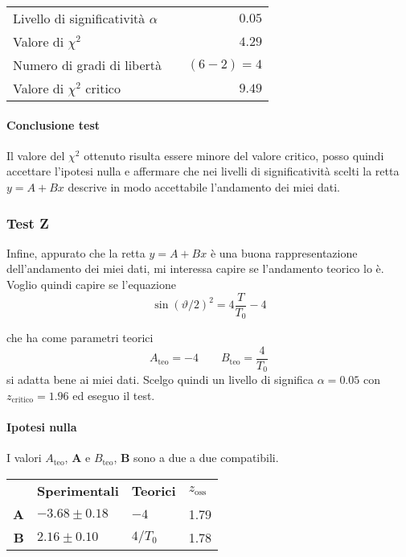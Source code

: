 \documentclass{article}
\begin{document}
\vspace{0.7cm}
\begin{table}[H]
	\centering
	\begin{tabular}{lr} 
		Livello di significatività $\alpha$		&$\quad 0.05$  \\
		Valore di $\chi ^2$             	& $\quad 4.29$       \\
		Numero di gradi di libertà      	& $\quad (6-2) = 4$         \\   
		Valore di $\chi ^2$ critico     	& $\quad 9.49$
	\end{tabular}
\end{table}
\vspace{0.7cm}

\paragraph{Conclusione test} Il valore del $\chi^2$ ottenuto risulta essere minore del valore critico, posso quindi accettare l'ipotesi nulla e affermare che nei livelli di significatività scelti la retta $y = A + Bx$ descrive in modo accettabile l'andamento dei miei dati.

\subsubsection{Test Z}
Infine, appurato che la retta $y = A + Bx$ è una buona rappresentazione dell'andamento dei miei dati, mi interessa capire se l'andamento teorico lo è. Voglio quindi capire se l'equazione 
\[
\sin{\left(\vartheta/2\right)}^2 = 4\frac{T}{T_0} - 4
\]

che ha come parametri teorici
\[
A_\text{teo} = -4 \qquad B_\text{teo} =  \frac{4}{T_0}
\]
si adatta bene ai miei dati. Scelgo quindi un livello di significa $\alpha = 0.05$ con $z_{\text{critico}} = 1.96$ ed eseguo il test.

\paragraph{Ipotesi nulla} I valori $A_{\text{teo}}$, $\mathbf{A}$ e  $B_{\text{teo}}$, $\mathbf{B}$ sono a due a due compatibili.

\begin{table}[H]
	\centering
	\begin{tabular}{@{}rp{3cm}p{2cm}p{2cm}@{}}
		
		&\textbf{Sperimentali} & \textbf{Teorici} & $z_{\text{oss}}$ \\ \cmidrule(r){2-4}
		\textbf{A}	&$-3.68 \pm 0.18 $		& $-4$	& 1.79 \\
		\textbf{B}	&$2.16 \pm  0.10$		& $4/T_0$ 		& 1.78 \\
	\end{tabular}
\end{table}
\end{document}
